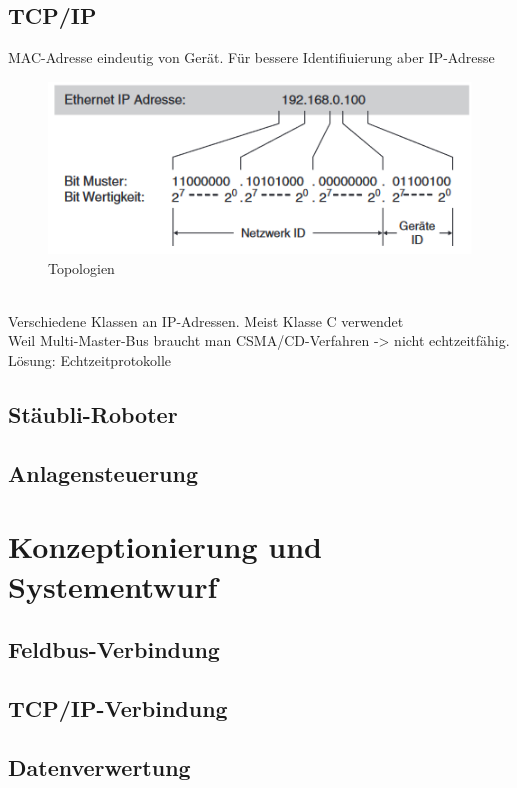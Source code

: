 \documentclass[ a4paper,
                oneside,
                toc=bibliography,
                toc=listof
                ]{scrbook}
\begin{document}
	\section{TCP/IP}
   
   	MAC-Adresse eindeutig von Gerät. Für bessere Identifiuierung aber IP-Adresse
   	\begin{figure}[!ht]
   		\centering
   		\includegraphics[width=0.70\linewidth]{./images/IP Adresse Aufbau.png}
   		\caption{Topologien}
   		\label{fig:Topologien}
   	\end{figure}
   	\\
   	Verschiedene Klassen an IP-Adressen. Meist Klasse C verwendet
   	\\
   	Weil Multi-Master-Bus braucht man CSMA/CD-Verfahren -> nicht echtzeitfähig. Lösung: Echtzeitprotokolle
   	\\
   	
   	\section{Stäubli-Roboter}
   	
   	\section{Anlagensteuerung}
   	
	\newpage
	\chapter{Konzeptionierung und Systementwurf}
	\section{Feldbus-Verbindung}
	
	\section{TCP/IP-Verbindung}
	
	\section{Datenverwertung}
	
\end{document}
